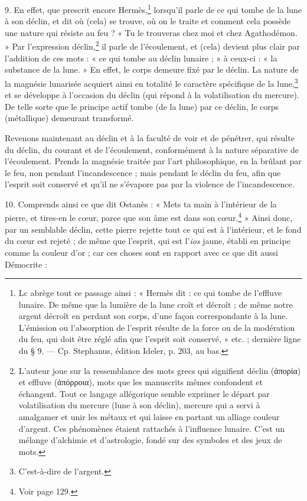 \documentclass[landscape, a4paper, 11pt, oneside, polutonikogreek, french]{article}
\begin{document}
9. En effet, que prescrit encore Hermès,\footnote{Lc abrège tout ce passage ainsi : « Hermès dit : ce qui tombe de l'effluve lunaire. De même que la lumière de la lune croît et décroît ; de même notre argent décroît en perdant son corps, d'une façon correspondante à la lune. L'émission ou l'absorption de l'esprit résulte de la force ou de la modération du feu, qui doit être réglé afin que l'esprit soit conservé, » etc. ; dernière ligne du § 9. --- Cp. Stephanus, édition Ideler, p. 203, au bas.} lorsqu'il parle de ce qui tombe de la lune à son déclin, et dit où (cela) se trouve, où on le traite et comment cela possède une nature qui résiste au feu ? « Tu le trouveras chez moi et chez Agathodémon. » Par l'expression déclin,\footnote{L'auteur joue sur la ressemblance des mots grecs qui signifient déclin (ἀπορία) et effluve (ἀπόρροια), mots que les manuscrits mêmes confondent et échangent. Tout ce langage allégorique semble exprimer le départ par volatilisation du mercure (lune à son déclin), mercure qui a servi à amalgamer et unir les métaux et qui laisse en partant un alliage couleur d'argent. Ces phénomènes étaient rattachés à l'influence lunaire. C'est un mélange d'alchimie et d'astrologie, fondé sur des symboles et des jeux de mots.} il parle de l'écoulement, et (cela) devient plus clair par l'addition de ces mots : « ce qui tombe au déclin lunaire ; » à ceux-ci : « la substance de la lune. » En effet, le corps demeure fixé par le déclin. La nature de la magnésie lunarisée acquiert ainsi en totalité le caractère spécifique de la lune,\footnote{C'est-à-dire de l'argent.} et se développe à l'occasion du déclin (qui répond à la volatilisation du mercure). De telle sorte que le principe actif tombe (de la lune) par ce déclin, le corps (métallique) demeurant transformé.

Revenons maintenant au déclin et à la faculté de voir et de pénétrer, qui résulte du déclin, du courant et de l'écoulement, conformément à la nature séparative de l'écoulement. Prends la magnésie traitée par l'art philosophique, en la brûlant par le feu, non pendant l'incandescence ; mais pendant le déclin du feu, afin que l'esprit soit conservé et qu'il ne s'évapore pas par la violence de l'incandescence.

10. Comprends ainsi ce que dit Ostanès : « Mets ta main à l'intérieur de la pierre, et tires-en le cœur, parce que son âme est dans son cœur.\footnote{Voir page 129.} » Ainsi donc, par un semblable déclin, cette pierre rejette tout ce qui est à l'intérieur, et le fond du cœur est rejeté ; de même que l'esprit, qui est l'\emph{ios} jaune, établi en principe comme la couleur d'or ; car ces choses sont en rapport avec ce que dit aussi Démocrite :
\end{document}
